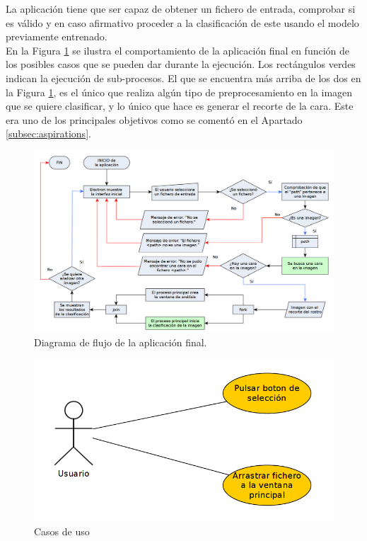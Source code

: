 \documentclass[a4paper,11pt]{book}
\begin{document}
La aplicación tiene que ser capaz de obtener un fichero de entrada, comprobar si es válido y en caso afirmativo proceder a la clasificación de este usando el modelo previamente entrenado.\\
En la Figura \ref{fig:appFlowchart} se ilustra el comportamiento de la aplicación final en función de los posibles casos que se pueden dar durante la ejecución. Los rectángulos verdes indican la ejecución de sub-procesos. El que se encuentra más arriba de los dos en la Figura \ref{fig:appFlowchart}, es el único que realiza algún tipo de preprocesamiento en la imagen que se quiere clasificar, y lo único que hace es generar el recorte de la cara. Este era uno de los principales objetivos como se comentó en el Apartado \ref{subsec:aspirations}.
\begin{figure}[t]
\centering
\includegraphics[width=1.0\linewidth]{imagenes/appFlowchart}
\caption[FlowChart]{Diagrama de flujo de la aplicación final.}
\label{fig:appFlowchart}
\end{figure}




\begin{figure}[t]
	\centering
	\includegraphics[width=0.7\linewidth]{imagenes/usecases}
	\caption[Casos de uso.]{Casos de uso}
	\label{fig:usecases}
\end{figure}
\end{document}
